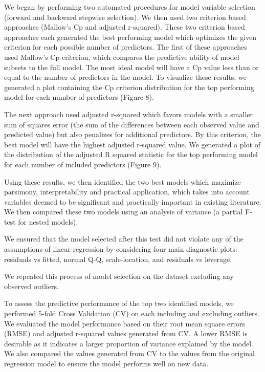 \documentclass[
]{article}
\begin{document}
We began by performing two automated procedures for model variable
selection (forward and backward stepwise selection). We then used two
criterion based approaches (Mallow's Cp and adjusted r-squared). These
two criterion based approaches each generated the best performing model
which optimizes the given criterion for each possible number of
predictors. The first of these approaches used Mallow's Cp criterion,
which compares the predictive ability of model subsets to the full
model. The most ideal model will have a Cp value less than or equal to
the number of predictors in the model. To visualize these results, we
generated a plot containing the Cp criterion distribution for the top
performing model for each number of predictors (Figure 8).

The next approach used adjusted r-squared which favors models with a
smaller sum of squares error (the sum of the differences between each
observed value and predicted value) but also penalizes for additional
predictors. By this criterion, the best model will have the highest
adjusted r-squared value. We generated a plot of the distribution of the
adjusted R squared statistic for the top performing model for each
number of included predictors (Figure 9).

Using these results, we then identified the two best models which
maximize parsimony, interpretability and practical application, which
takes into account variables deemed to be significant and practically
important in existing literature. We then compared these two models
using an analysis of variance (a partial F-test for nested models).

We ensured that the model selected after this test did not violate any
of the assumptions of linear regression by considering four main
diagnostic plots: residuals vs fitted, normal Q-Q, scale-location, and
residuals vs leverage.

We repeated this process of model selection on the dataset excluding any
observed outliers.

To assess the predictive performance of the top two identified models,
we performed 5-fold Cross Validation (CV) on each including and
excluding outliers. We evaluated the model performance based on their
root mean square errors (RMSE) and adjusted r-squared values generated
from CV. A lower RMSE is desirable as it indicates a larger proportion
of variance explained by the model. We also compared the values
generated from CV to the values from the original regression model to
ensure the model performs well on new data.
\end{document}

